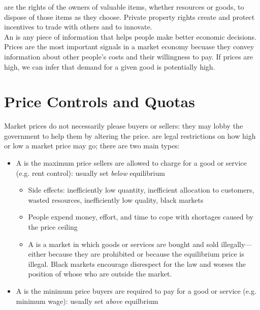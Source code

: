 \documentclass{article}
\begin{document}
 are the rights of the owners of valuable items, whether resources or goods, to dispose of those items as they choose. Private property rights create and protect incentives to trade with others and to innovate. \\ 

An  is any piece of information that helps people make better economic decisions. Prices are the most important signals in a market economy becuase they convey information about other people's costs and their willingness to pay. If prices are high, we can infer that demand for a given good is potentially high. 

\section{Price Controls and Quotas}

Market prices do not necessarily please buyers or sellers: they may lobby the government to help them by altering the price.  are legal restrictions on how high or low a market price may go; there are two main types: 
\begin{itemize}
  \item A  is the maximum price sellers are allowed to charge for a good or service (e.g. rent control): usually set \emph{below} equilibrium 
    \begin{itemize}
      \item Side effects: inefficiently low quantity, inefficient allocation to customers, wasted resources, inefficiently low quality, black markets
      \item People expend money, effort, and time to cope with shortages caused by the price ceiling 
      \item A  is a market in which goods or services are bought and sold illegally---either because they are prohibited or because the equilibrium price is illegal. Black markets encourage disrespect for the law and worses the position of whose who are outside the market. 
    \end{itemize}
  \item A  is the minimum price buyers are required to pay for a good or service (e.g. minimum wage): usually set \emph{above} equilbrium
\end{itemize}
\end{document}
